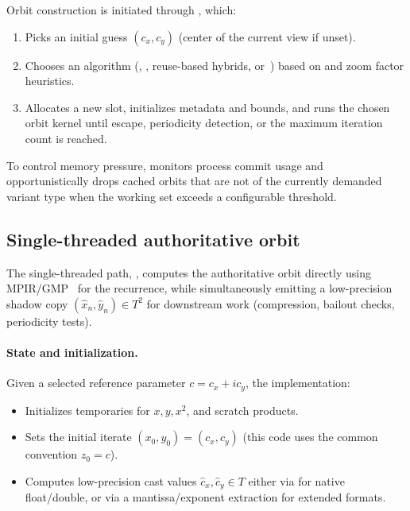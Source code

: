 Orbit construction is initiated through , which:

\begin{enumerate}
  \item Picks an initial guess \((c_x,c_y)\) (center of the current view
        if unset).
  \item Chooses an algorithm (, , reuse-based
        hybrids, or~) based on
         and zoom factor heuristics.
  \item Allocates a new  slot, initializes
        metadata and bounds, and runs the chosen orbit kernel until escape,
        periodicity detection, or the maximum iteration count is reached.
\end{enumerate}

To control memory pressure,  monitors process commit 
usage and opportunistically drops cached orbits that are not of the currently 
demanded variant type when the working set exceeds a configurable threshold.

\subsection{Single-threaded authoritative orbit}
\label{subsec:ref-orbit-st}

The single-threaded path,
,
computes the authoritative orbit directly using
MPIR/GMP~\cite{MPIR_Library}  for the recurrence, while
simultaneously emitting a low-precision shadow copy
\((\hat{x}_n,\hat{y}_n)\in T^2\) for downstream work (compression,
bailout checks, periodicity tests).

\paragraph{State and initialization.}

Given a selected reference parameter \(c = c_x + i c_y\), the implementation:

\begin{itemize}
  \item Initializes  temporaries for \(x,y,x^2\), and scratch products.
  \item Sets the initial iterate \((x_0,y_0) = (c_x,c_y)\) (this code uses the common convention \(z_0=c\)).
  \item Computes low-precision cast values \(\hat{c}_x,\hat{c}_y \in T\) either via  for
        native float/double, or via a mantissa/exponent extraction for extended formats.
\end{itemize}

